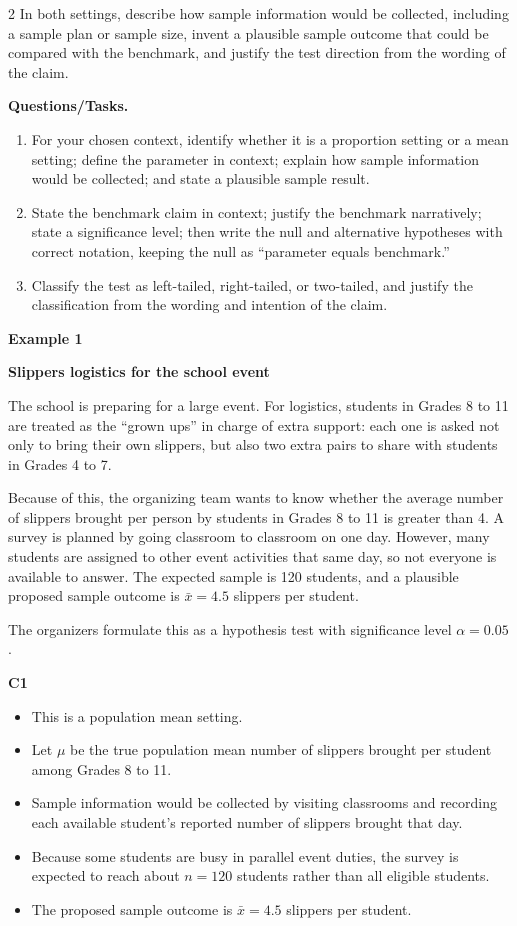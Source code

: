 \documentclass[12pt]{article}
\newcommand{\SubsectionBox}[1]{%
\noindent\colorbox{gray!30}{%
\parbox{\linewidth}{\textbf{#1}}%
}\par\vspace{0.35cm}%
}
\begin{document}
\begin{multicols}{2}
In both settings, describe how sample information would be collected, including a sample plan or sample size, invent a plausible sample outcome that could be compared with the benchmark, and justify the test direction from the wording of the claim.

\textbf{Questions/Tasks.}
\begin{enumerate}
\item[(C1)] For your chosen context, identify whether it is a proportion setting or a mean setting; define the parameter in context; explain how sample information would be collected; and state a plausible sample result.
\item[(C2)] State the benchmark claim in context; justify the benchmark narratively; state a significance level; then write the null and alternative hypotheses with correct notation, keeping the null as ``parameter equals benchmark.''
\item[(C3)] Classify the test as left-tailed, right-tailed, or two-tailed, and justify the classification from the wording and intention of the claim.
\end{enumerate}

\vspace{0.25cm}
\SubsectionBox{Example 1}\vspace{-0.25cm}

\textbf{Slippers logistics for the school event}

The school is preparing for a large event. For logistics, students in Grades 8 to 11 are treated as the ``grown ups'' in charge of extra support: each one is asked not only to bring their own slippers, but also two extra pairs to share with students in Grades 4 to 7.

Because of this, the organizing team wants to know whether the average number of slippers brought per person by students in Grades 8 to 11 is greater than 4. A survey is planned by going classroom to classroom on one day. However, many students are assigned to other event activities that same day, so not everyone is available to answer. The expected sample is 120 students, and a plausible proposed sample outcome is \(\bar{x}=4.5\) slippers per student.

The organizers formulate this as a hypothesis test with significance level \(\alpha=0.05\).

\textbf{C1}
\begin{itemize}
\item This is a population mean setting.
\item Let \(\mu\) be the true population mean number of slippers brought per student among Grades 8 to 11.
\item Sample information would be collected by visiting classrooms and recording each available student's reported number of slippers brought that day.
\item Because some students are busy in parallel event duties, the survey is expected to reach about \(n=120\) students rather than all eligible students.
\item The proposed sample outcome is \(\bar{x}=4.5\) slippers per student.
\end{itemize}


\end{multicols}
\end{document}
